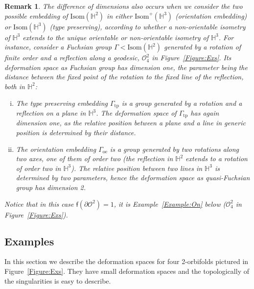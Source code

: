 \documentclass[a4paper,11pt]{article}
\newtheorem{Remark}[Theorem]{Remark}
\begin{document}
\begin{Remark}
The difference of dimensions also occurs when we consider the two possible 
 embedding of 
 $\mathrm{Isom}(\mathbb H^2)$ in either $\mathrm{Isom}^+(\mathbb H^3)$
 (orientation embedding) 
 or $\mathrm{Isom}(\mathbb H^3)$ (type preserving), according to whether a non-orientable
 isometry of $\mathbb H^3$ extends to the unique orientable or non-orientable isometry of $\mathbb H^3$.
For instance, consider a Fuchsian group $\Gamma<\mathrm{Isom}(\mathbb H^2)$ 
generated by a rotation of finite order and a reflection along a geodesic,
$\mathcal O^2_4$ in 
 Figure~\ref{Figure:Exs}.
Its deformation space as Fuchsian group has dimension one, 
the parameter being the distance between the fixed point of the rotation to the fixed line of the reflection, 
both in $\mathbb H^2$:
\begin{enumerate}[(i)]
 \item The type preserving embedding $\Gamma_{\mathrm{tp}}$
is a group generated by a rotation and a reflection on a
plane in $\mathbb H^3$. The deformation space of $\Gamma_{\mathrm{tp}}$ 
has again dimension one, as the relative position between a plane and a line 
in generic position is determined by their distance. 
\item The orientation embedding $\Gamma_{\mathrm{oe}}$
is a group generated by two rotations along two axes, one of them of order two (the reflection in $\mathbb H^2$
extends to a rotation of order two in $\mathbb H^3$).
The relative position between two lines in $\mathbb H^3$
is determined by two parameters, hence the deformation space as quasi-Fuchsian group has dimension 2. 
\end{enumerate}
Notice that in this case $\mathsf{f}(\partial \mathcal O^2) =1 $,
 it is Example~\ref{Example:On} below ($\mathcal O^2_4$ in 
 Figure~\ref{Figure:Exs}).
\end{Remark}


\subsection{Examples}
\label{section:Examples}


 
In this section we describe the deformation spaces for four
 2-orbifolds pictured in Figure~\ref{Figure:Exs}. 
 They have small deformation spaces and the topologically of the singularities is easy to describe. 
 
\end{document}
